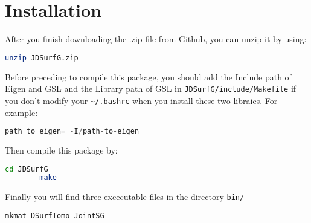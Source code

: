 \documentclass[UTF8]{article}
\begin{document}
   \section{Installation}
   After you finish downloading the .zip file from Github, you can unzip it by using:
    \begin{lstlisting}[language=bash]
    unzip JDSurfG.zip
    \end{lstlisting}
   Before preceding to compile this package, you should add the Include path of Eigen and GSL 
   and the Library path of GSL in \verb!JDSurfG/include/Makefile! if you don't modify your 
   \verb!~/.bashrc! when you install these two libraies. For example:
   \begin{lstlisting}[language=c]
    path_to_eigen= -I/path-to-eigen
\end{lstlisting}

    Then compile this package by:
    \begin{lstlisting}[language=bash]
        cd JDSurfG
        make
    \end{lstlisting}
    Finally you will find three excecutable files in the directory \verb!bin/!
    \begin{lstlisting}[language=bash]
        mkmat DSurfTomo JointSG  
     \end{lstlisting}
    
\end{document}
